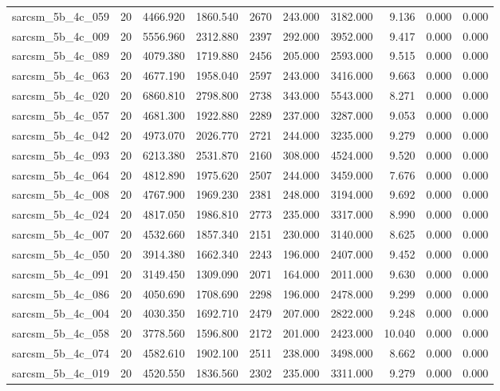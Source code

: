 \begin{tabular}{lrrrrrrrrr}
sarcsm\_5b\_4c\_059 & 20 & 4466.920 & 1860.540 & 2670 & 243.000 & 3182.000 & 9.136 & 0.000 & 0.000 \\
sarcsm\_5b\_4c\_009 & 20 & 5556.960 & 2312.880 & 2397 & 292.000 & 3952.000 & 9.417 & 0.000 & 0.000 \\
sarcsm\_5b\_4c\_089 & 20 & 4079.380 & 1719.880 & 2456 & 205.000 & 2593.000 & 9.515 & 0.000 & 0.000 \\
sarcsm\_5b\_4c\_063 & 20 & 4677.190 & 1958.040 & 2597 & 243.000 & 3416.000 & 9.663 & 0.000 & 0.000 \\
sarcsm\_5b\_4c\_020 & 20 & 6860.810 & 2798.800 & 2738 & 343.000 & 5543.000 & 8.271 & 0.000 & 0.000 \\
sarcsm\_5b\_4c\_057 & 20 & 4681.300 & 1922.880 & 2289 & 237.000 & 3287.000 & 9.053 & 0.000 & 0.000 \\
sarcsm\_5b\_4c\_042 & 20 & 4973.070 & 2026.770 & 2721 & 244.000 & 3235.000 & 9.279 & 0.000 & 0.000 \\
sarcsm\_5b\_4c\_093 & 20 & 6213.380 & 2531.870 & 2160 & 308.000 & 4524.000 & 9.520 & 0.000 & 0.000 \\
sarcsm\_5b\_4c\_064 & 20 & 4812.890 & 1975.620 & 2507 & 244.000 & 3459.000 & 7.676 & 0.000 & 0.000 \\
sarcsm\_5b\_4c\_008 & 20 & 4767.900 & 1969.230 & 2381 & 248.000 & 3194.000 & 9.692 & 0.000 & 0.000 \\
sarcsm\_5b\_4c\_024 & 20 & 4817.050 & 1986.810 & 2773 & 235.000 & 3317.000 & 8.990 & 0.000 & 0.000 \\
sarcsm\_5b\_4c\_007 & 20 & 4532.660 & 1857.340 & 2151 & 230.000 & 3140.000 & 8.625 & 0.000 & 0.000 \\
sarcsm\_5b\_4c\_050 & 20 & 3914.380 & 1662.340 & 2243 & 196.000 & 2407.000 & 9.452 & 0.000 & 0.000 \\
sarcsm\_5b\_4c\_091 & 20 & 3149.450 & 1309.090 & 2071 & 164.000 & 2011.000 & 9.630 & 0.000 & 0.000 \\
sarcsm\_5b\_4c\_086 & 20 & 4050.690 & 1708.690 & 2298 & 196.000 & 2478.000 & 9.299 & 0.000 & 0.000 \\
sarcsm\_5b\_4c\_004 & 20 & 4030.350 & 1692.710 & 2479 & 207.000 & 2822.000 & 9.248 & 0.000 & 0.000 \\
sarcsm\_5b\_4c\_058 & 20 & 3778.560 & 1596.800 & 2172 & 201.000 & 2423.000 & 10.040 & 0.000 & 0.000 \\
sarcsm\_5b\_4c\_074 & 20 & 4582.610 & 1902.100 & 2511 & 238.000 & 3498.000 & 8.662 & 0.000 & 0.000 \\
sarcsm\_5b\_4c\_019 & 20 & 4520.550 & 1836.560 & 2302 & 235.000 & 3311.000 & 9.279 & 0.000 & 0.000 \\

\end{tabular}
